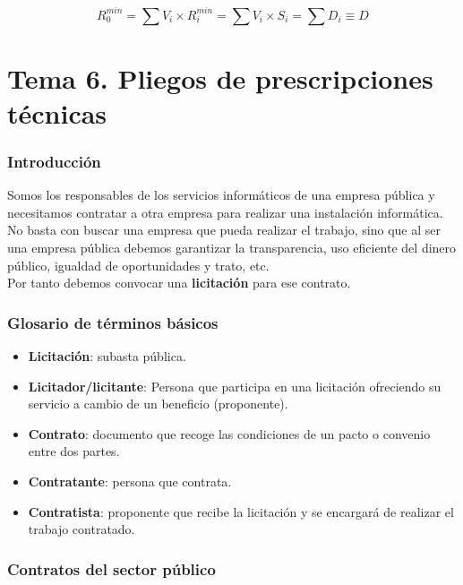 \documentclass[12pt,spanish]{article}
\begin{document}
\begin{equation*}
	R_0^{min} = \sum{V_i \times R_i^{min}} =  \sum{V_i \times S_i} = \sum{D_i} \equiv D
\end{equation*}

\newpage


\section{Tema 6. Pliegos de prescripciones técnicas}

\subsubsection{Introducción}

Somos los responsables de los servicios informáticos de una empresa pública y necesitamos contratar a otra empresa para realizar una instalación informática. No basta con buscar una empresa que pueda realizar el trabajo, sino que al ser una empresa pública debemos garantizar la transparencia, uso eficiente del dinero público, igualdad de oportunidades y trato, etc.\\

Por tanto debemos convocar una \textbf{licitación} para ese contrato.

\subsubsection{Glosario de términos básicos}

\begin{itemize}
	\item \textbf{Licitación}: subasta pública.
	\item \textbf{Licitador/licitante}: Persona que participa en una licitación ofreciendo su servicio a cambio de un beneficio (proponente).
	\item \textbf{Contrato}: documento que recoge las condiciones de un pacto o convenio entre dos partes.
	\item \textbf{Contratante}: persona que contrata.
	\item \textbf{Contratista}: proponente que recibe la licitación y se encargará de realizar el trabajo contratado.
\end{itemize}

\subsubsection{Contratos del sector público}
\end{document}
